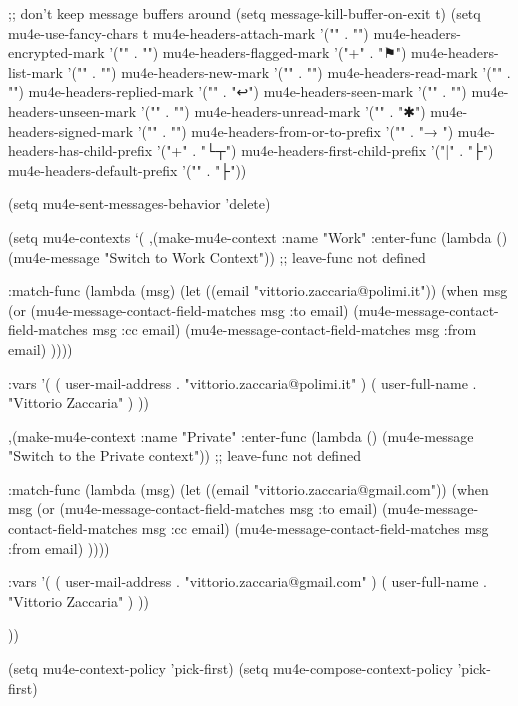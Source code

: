 \documentclass[presentation]{beamer}
\begin{document}
{{{{{{;; don't keep message buffers around
(setq message-kill-buffer-on-exit t)
(setq mu4e-use-fancy-chars  t
      mu4e-headers-attach-mark '("" . "")
      mu4e-headers-encrypted-mark '("" . "")
      mu4e-headers-flagged-mark '("+" . "⚑")
      mu4e-headers-list-mark '("" . "")
      mu4e-headers-new-mark '("" . "")
      mu4e-headers-read-mark '("" . "")
      mu4e-headers-replied-mark '("" . "↩")
      mu4e-headers-seen-mark '("" . "")
      mu4e-headers-unseen-mark '("" . "")
      mu4e-headers-unread-mark '("" . "✱")
      mu4e-headers-signed-mark '("" . "")
      mu4e-headers-from-or-to-prefix '("" . "→ ")
      mu4e-headers-has-child-prefix '("+" . "└┬")
      mu4e-headers-first-child-prefix '("|" . "├")
      mu4e-headers-default-prefix '("" . "├"))



(setq mu4e-sent-messages-behavior 'delete)

(setq mu4e-contexts
      `(
        ,(make-mu4e-context
          :name "Work"
          :enter-func (lambda () (mu4e-message "Switch to Work Context"))
          ;; leave-func not defined

:match-func (lambda (msg)
              (let ((email "vittorio.zaccaria@polimi.it"))
                (when msg
                  (or
                   (mu4e-message-contact-field-matches msg :to email)
                   (mu4e-message-contact-field-matches msg :cc email)
                   (mu4e-message-contact-field-matches msg :from email)
                   ))))


:vars '(  ( user-mail-address	. "vittorio.zaccaria@polimi.it"  )
          ( user-full-name	    . "Vittorio Zaccaria" )
          ))

,(make-mu4e-context
  :name "Private"
  :enter-func (lambda () (mu4e-message "Switch to the Private context"))
  ;; leave-func not defined

:match-func (lambda (msg)
              (let ((email "vittorio.zaccaria@gmail.com"))
                (when msg
                  (or
                   (mu4e-message-contact-field-matches msg :to email)
                   (mu4e-message-contact-field-matches msg :cc email)
                   (mu4e-message-contact-field-matches msg :from email)
                   ))))


:vars '(  ( user-mail-address	. "vittorio.zaccaria@gmail.com"  )
          ( user-full-name	    . "Vittorio Zaccaria" )
          ))

))

(setq mu4e-context-policy 'pick-first)
(setq mu4e-compose-context-policy 'pick-first)

}}}}}}
\end{document}
